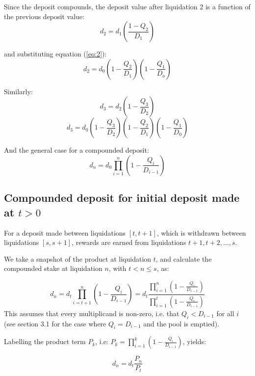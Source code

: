 \documentclass[reqno]{article}
\begin{document}
\bigskip
Since the deposit compounds, the deposit value after liquidation 2 is a function of the previous deposit value:
\begin{equation} 
    d_2=d_1\left(\frac{1-Q_2}{D_1}\right)
\end{equation}

\bigskip
and substituting equation (\ref{eq:2}):
\begin{equation} 
    d_2=d_0 \left(1-\frac{Q_2}{D_1}\right) \left(1-\frac{Q_1}{D_o} \right)
\end{equation}

\bigskip
Similarly:
\begin{equation} 
    d_3=d_2\left(1-\frac{Q_3}{D_2}\right)
\end{equation}
\begin{equation} 
    d_3=d_0\left(1-\frac{Q_3}{D_2}\right)\left(1-\frac{Q_2}{D_1}\right)\left(1-\frac{Q_1}{D_0}\right)
\end{equation}

\bigskip
And the general case for a compounded deposit:
\begin{equation} \label{eq:8}
    d_n=d_0\prod^n_{i=1}{\left(1-\frac{Q_i}{D_{i-1}}\right)}
\end{equation}
\subsection{Compounded deposit for initial deposit made at $t>0$}
For a deposit made between liquidations $[t, t+1]$, which is withdrawn between liquidations $[s, s+1]$, rewards are earned from liquidations $t+1, t+2, \ldots, s$.

We take a snapshot of the product at liquidation $t$, and calculate the compounded stake at liquidation $n$, with $t < n \leq s$, as:

\begin{equation} 
    d_n=d_t\prod^n_{i=t+1}{\left(1-\frac{Q_i}{D_{i-1}}\right)}=d_t\frac{\displaystyle\prod^n_{i=1}{\left(1-\frac{Q_i}{D_{i-1}}\right)}}{\displaystyle\prod^t_{i=1}\left(1-\frac{Q_i}{D_{i-1}}\right)}
\end{equation}
This assumes that every multiplicand is non-zero, i.e. that $Q_i < D_{i-1}$ for all $i$ (see section 3.1 for the case where $Q_i = D_{i-1}$ and the pool is emptied).

\bigskip
Labelling the product term $P_k$, i.e: $P_k = \displaystyle\prod^k_{i=1}{\left(1-\frac{Q_i}{D_{i-1}}\right)}$, yields:

\begin{equation} \label{eq:10}
d_n=d_t\frac{P_n}{P_t}
\end{equation}
\end{document}
